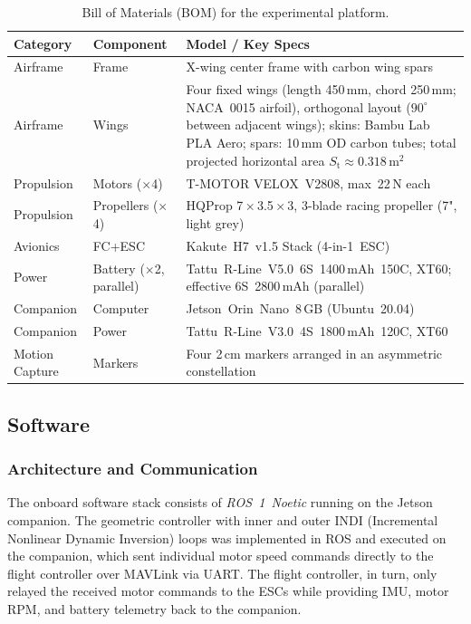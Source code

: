 \begin{table}[h]
\centering
\caption{Bill of Materials (BOM) for the experimental platform.}
\label{tab:bom}
\small
\begin{tabularx}{\textwidth}{ll>{\raggedright\arraybackslash}X}
\toprule
Category & Component & Model / Key Specs \\
\midrule
Airframe & Frame & X-wing center frame with carbon wing spars \\
Airframe & Wings & Four fixed wings (length 450\,mm, chord 250\,mm; NACA~0015 airfoil), orthogonal layout ($90^{\circ}$ between adjacent wings); skins: Bambu Lab PLA Aero; spars: 10\,mm OD carbon tubes; total projected horizontal area $S_\mathrm{t}\approx 0.318$\,m$^2$ \\
Propulsion & Motors ($\times$4) & T-MOTOR VELOX~V2808, max~22\,N each \\
Propulsion & Propellers ($\times$4) & HQProp 7\,×\,3.5\,×\,3, 3-blade racing propeller (7", light grey) \\
Avionics & FC+ESC & Kakute~H7~v1.5 Stack (4-in-1~ESC) \\
Power & Battery ($\times$2, parallel) & Tattu~R-Line~V5.0~6S~1400\,mAh~150C, XT60; effective 6S~2800\,mAh (parallel) \\
Companion & Computer & Jetson~Orin~Nano~8\,GB (Ubuntu~20.04) \\
Companion & Power & Tattu~R-Line~V3.0~4S~1800\,mAh~120C, XT60 \\
Motion Capture & Markers & Four 2\,cm markers arranged in an asymmetric constellation \\
\bottomrule
\end{tabularx}
\end{table}

\subsection{Software}

\subsubsection{Architecture and Communication}
The onboard software stack consists of \textit{ROS~1~Noetic} running on the Jetson companion. The geometric controller with inner and outer INDI (Incremental Nonlinear Dynamic Inversion) loops was implemented in ROS and executed on the companion, which sent individual motor speed commands directly to the flight controller over MAVLink via UART. The flight controller, in turn, only relayed the received motor commands to the ESCs while providing IMU, motor RPM, and battery telemetry back to the companion.

